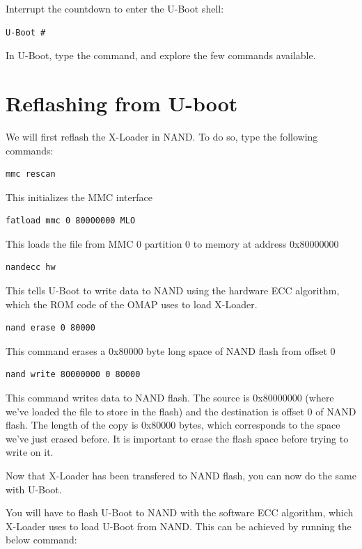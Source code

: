 Interrupt the countdown to enter the U-Boot shell:
\begin{verbatim}
U-Boot #
\end{verbatim}

In U-Boot, type the  command, and explore the few commands available.

\section{Reflashing from U-boot}

We will first reflash the X-Loader in NAND. To do so, type the following commands:

\begin{verbatim}
mmc rescan
\end{verbatim}

This initializes the MMC interface

\begin{verbatim}
fatload mmc 0 80000000 MLO
\end{verbatim}
This loads the file from MMC 0 partition 0 to memory at address 0x80000000

\begin{verbatim}
nandecc hw
\end{verbatim}

This tells U-Boot to write data to NAND using the hardware ECC
algorithm, which the ROM code of the OMAP uses to load X-Loader.

\begin{verbatim}
nand erase 0 80000
\end{verbatim}

This command erases a 0x80000 byte long space of NAND flash from offset 0

\begin{verbatim}
nand write 80000000 0 80000
\end{verbatim}

This command writes data to NAND flash. The source is 0x80000000
(where we've loaded the file to store in the flash) and the
destination is offset 0 of NAND flash. The length of the copy is
0x80000 bytes, which corresponds to the space we've just erased
before. It is important to erase the flash space before trying to
write on it.

Now that X-Loader has been transfered to NAND flash, you can now do the same
with U-Boot. 

You will have to flash U-Boot to NAND with the software ECC algorithm, which
X-Loader uses to load U-Boot from NAND. This can be achieved by
running the below command:

